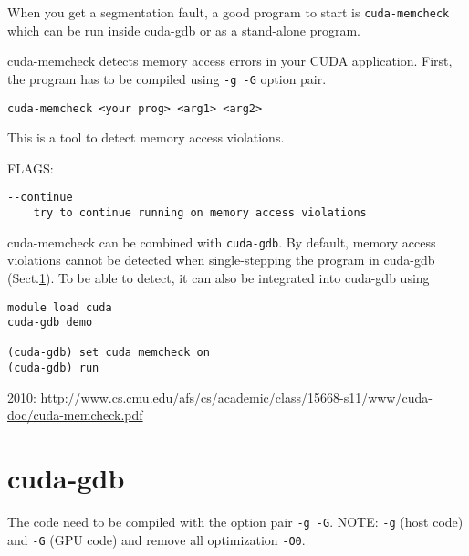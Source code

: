 When you get a segmentation fault, a good program to start is
\verb!cuda-memcheck! which can be run inside cuda-gdb or as a
stand-alone program.

cuda-memcheck detects memory access errors in your CUDA application.
First, the program has to be compiled using \verb!-g -G! option pair.

\begin{verbatim}
cuda-memcheck <your prog> <arg1> <arg2>
\end{verbatim}
This is a tool to detect memory access violations. 
 
FLAGS:
\begin{verbatim}
--continue 
	try to continue running on memory access violations

\end{verbatim}

cuda-memcheck can be combined with \verb!cuda-gdb!. By default, memory access
violations cannot be detected when single-stepping the program in cuda-gdb
(Sect.\ref{sec:cuda-gdb}). To be able to detect, it can also be integrated into
cuda-gdb using
\begin{verbatim}
module load cuda
cuda-gdb demo

(cuda-gdb) set cuda memcheck on
(cuda-gdb) run
\end{verbatim}


2010: \url{http://www.cs.cmu.edu/afs/cs/academic/class/15668-s11/www/cuda-doc/cuda-memcheck.pdf}



\section{cuda-gdb}
\label{sec:cuda-gdb}

The code need to be compiled with the option pair \verb!-g -G!. NOTE: \verb!-g!
(host code) and \verb!-G! (GPU code) and remove all optimization \verb!-O0!.

